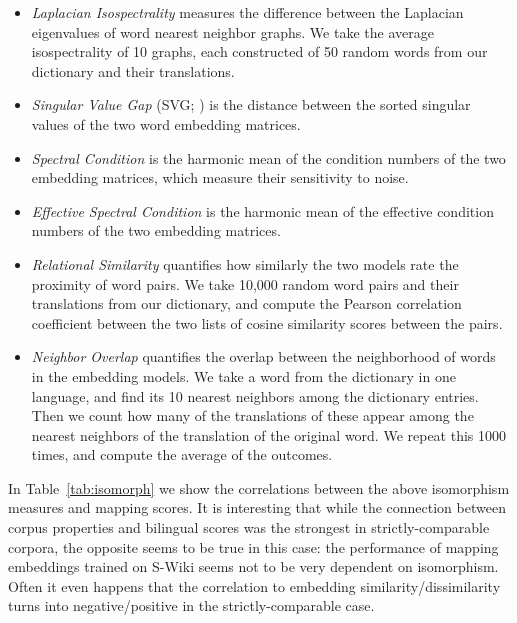 \documentclass[11pt]{article}
\begin{document}
    \begin{itemize}
        \item \textit{Laplacian Isospectrality} \cite{sogaard-etal-2018-limitations} measures the difference between the Laplacian eigenvalues of word nearest neighbor graphs. We take the average isospectrality of 10 graphs, each constructed of 50 random words from our dictionary and their translations.
        
        \item \textit{Singular Value Gap} (SVG; \citealp{dubossarsky-etal-2020-secret}) is the distance between the sorted singular values of the two word embedding matrices.
        
        \item \textit{Spectral Condition} \cite{dubossarsky-etal-2020-secret} is the harmonic mean of the condition numbers of the two embedding matrices, which measure their sensitivity to noise.
        
        \item \textit{Effective Spectral Condition} \cite{dubossarsky-etal-2020-secret} is the harmonic mean of the effective condition numbers of the two embedding matrices.
        
        \item \textit{Relational Similarity} \cite{vulic-etal-2020-good} quantifies how similarly the two models rate the proximity of word pairs. We take 10,000 random word pairs and their translations from our dictionary, and compute the Pearson correlation coefficient between the two lists of cosine similarity scores between the pairs.
        
        \item \textit{Neighbor Overlap} quantifies the overlap between the neighborhood of words in the embedding models. We take a word from the dictionary in one language, and find its 10 nearest neighbors among the dictionary entries. Then we count how many of the translations of these appear among the nearest neighbors of the translation of the original word. We repeat this 1000 times, and compute the average of the outcomes. 
        
    \end{itemize}

    In Table~\ref{tab:isomorph} we show the correlations between the above isomorphism measures and mapping scores. It is interesting that while the connection between corpus properties and bilingual scores was the strongest in strictly-comparable corpora, the opposite seems to be true in this case: the performance of mapping embeddings trained on S-Wiki seems not to be very dependent on isomorphism. Often it even happens that the correlation to embedding similarity/dissimilarity turns into negative/positive in the strictly-comparable case. 
    
\end{document}

